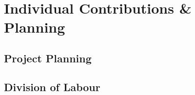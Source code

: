 \documentclass[main.tex]{subfiles}
\begin{document}
\chapter{Individual Contributions \& Planning}
\section{Project Planning}
\section{Division of Labour}
\end{document}
